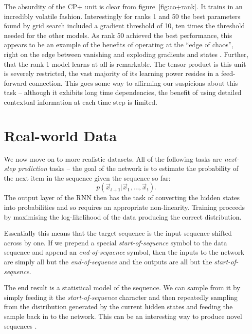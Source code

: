 The absurdity of the CP+ unit is clear from figure~\ref{fig:co+rank}.
It trains in an incredibly volatile fashion. Interestingly for ranks
1 and 50 the best parameters found by grid search included a gradient
threshold of 10, ten times the threshold needed for the other models.
As rank 50 achieved the best performance, this appears to be an
example of the benefits of operating at the ``edge of chaos'',
right on the edge between vanishing and exploding gradients and states
\autocite{Bertschinger2004}. Further, that the rank 1 model learns
at all is remarkable. The tensor product is this unit is severely
restricted, the vast majority of its learning power resides in a
feed-forward connection. This goes some way to affirming our suspicions
about this task -- although  it exhibits long time dependencies, the
benefit of using detailed contextual information at each time step is
limited.

\section{Real-world Data}
We now move on to more realistic datasets. All of the following tasks are
\emph{next-step prediction} tasks -- the goal of the network is to estimate
the probability of the next item in the sequence given the sequence so far:
\begin{equation} \label{eq:seqprob}
	p(\vec{x}_{t+1} | \vec{x}_{1},\ldots,\vec{x}_{t}).
\end{equation} The output layer of the RNN then has the task of converting
the hidden states into probabilities and so requires an appropriate non-linearity.
Training proceeds by maximising the log-likelihood of the data producing the
correct distribution.

Essentially this means that the target sequence is the input
sequence shifted across by one. If we prepend a special \emph{start-of-sequence}
symbol to the data sequence and append an \emph{end-of-sequence} symbol,
then the inputs to the network are simply all but the \emph{end-of-sequence}
and the outputs are all but the \emph{start-of-sequence}.

The end result is a statistical model of the sequence. We can sample from it
by simply feeding it the \emph{start-of-sequence} character and then repeatedly
sampling from the distribution generated by the current hidden states and
feeding the sample back in to the network. This can be an interesting way to
produce novel sequences \autocite{Graves2013}.

